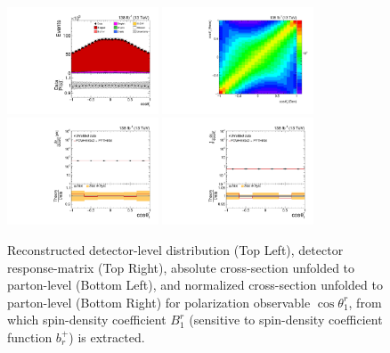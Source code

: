 \clearpage
\begin{figure}[htb]
\begin{center}
 \includegraphics[width=0.40\textwidth]{fig_fullRun2UL/controlplots/combined/Hyp_AntiLeptonBr.pdf}
 \includegraphics[width=0.40\textwidth]{fig_fullRun2UL/unfolding/combined/ResponseMatrix_b1r.pdf} \\
 \includegraphics[width=0.40\textwidth]{fig_fullRun2UL/unfolding/combined/UnfoldedResults_b1r.pdf}
 \includegraphics[width=0.40\textwidth]{fig_fullRun2UL/unfolding/combined/UnfoldedResultsNorm_b1r.pdf} \\
\label{fig:b1r}
\caption{Reconstructed detector-level distribution (Top Left), detector response-matrix (Top Right), absolute cross-section unfolded to parton-level (Bottom Left), and normalized cross-section unfolded to parton-level (Bottom Right) for polarization observable $\cos\theta_{1}^{r}$, from which spin-density coefficient $B_{1}^{r}$ (sensitive to spin-density coefficient function $b_r^{+}$) is extracted.}
\end{center}
\end{figure}
